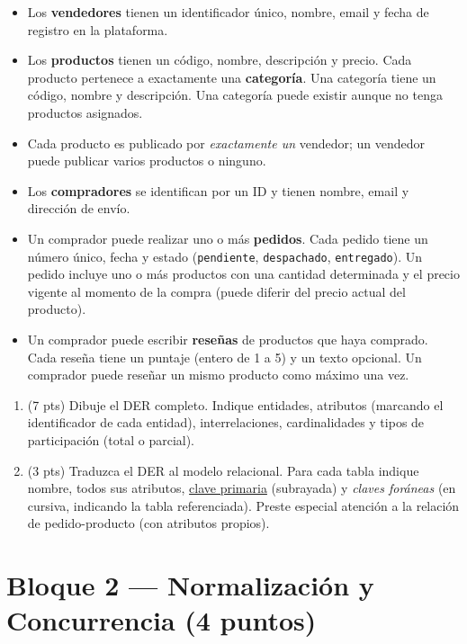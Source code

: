 \documentclass[11pt,a4paper]{article}
\begin{document}
\begin{itemize}
  \item Los \textbf{vendedores} tienen un identificador único, nombre, email y fecha de registro en la plataforma.
  \item Los \textbf{productos} tienen un código, nombre, descripción y precio. Cada producto pertenece a exactamente una \textbf{categoría}. Una categoría tiene un código, nombre y descripción. Una categoría puede existir aunque no tenga productos asignados.
  \item Cada producto es publicado por \emph{exactamente un} vendedor; un vendedor puede publicar varios productos o ninguno.
  \item Los \textbf{compradores} se identifican por un ID y tienen nombre, email y dirección de envío.
  \item Un comprador puede realizar uno o más \textbf{pedidos}. Cada pedido tiene un número único, fecha y estado (\texttt{pendiente}, \texttt{despachado}, \texttt{entregado}). Un pedido incluye uno o más productos con una cantidad determinada y el precio vigente al momento de la compra (puede diferir del precio actual del producto).
  \item Un comprador puede escribir \textbf{reseñas} de productos que haya comprado. Cada reseña tiene un puntaje (entero de 1 a 5) y un texto opcional. Un comprador puede reseñar un mismo producto como máximo una vez.
\end{itemize}

\begin{enumerate}
  \item (7 pts) Dibuje el DER completo. Indique entidades, atributos (marcando el identificador de cada entidad), interrelaciones, cardinalidades y tipos de participación (total o parcial).

  \vspace{12cm}

  \item (3 pts) Traduzca el DER al modelo relacional. Para cada tabla indique nombre, todos sus atributos, \underline{clave primaria} (subrayada) y \textit{claves foráneas} (en cursiva, indicando la tabla referenciada). Preste especial atención a la relación de pedido-producto (con atributos propios).
\end{enumerate}

\newpage

\section*{Bloque 2 — Normalización y Concurrencia \hfill\normalfont(4 puntos)}
\end{document}
